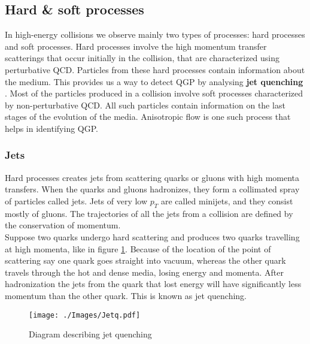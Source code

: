 \documentclass[12pt,a4paper,twoside]{report}
\begin{document}
\subsection{Hard \& soft processes}
In high-energy collisions we observe mainly two types of processes: hard processes and soft processes. Hard processes involve the high momentum transfer scatterings that occur initially in the collision, that are characterized using perturbative QCD. Particles from these hard processes contain information about the medium. This provides us a way to detect QGP by analysing \textbf{jet quenching} \cite{Ref:jetQ-paper3}. Most of the particles produced in a collision involve soft processes characterized by non-perturbative QCD. All such particles contain information on the last stages of the evolution of the media. Anisotropic flow is one such process that helps in identifying QGP.
\subsubsection{Jets}
Hard processes creates jets from scattering quarks or gluons with high momenta transfers. When the quarks and gluons hadronizes, they form a collimated spray of particles called jets. Jets of very low $p_T$ are called minijets, and they consist mostly of gluons. The trajectories of all the jets from a collision are defined by the conservation of momentum.\\
Suppose two quarks undergo hard scattering and produces two quarks travelling at high momenta, like in figure \ref{fig:JetQ}. Because of the location of the point of scattering say one quark goes straight into vacuum, whereas the other quark travels through the hot and dense media, losing energy and momenta. After hadronization the jets from the quark that lost energy will have significantly less momentum than the other quark. This is known as jet quenching.
\begin{figure}[H]
	\centering
	\texttt{[image: ./Images/Jetq.pdf]}
	\caption{\label{fig:JetQ}Diagram describing jet quenching}
\end{figure}
\end{document}
